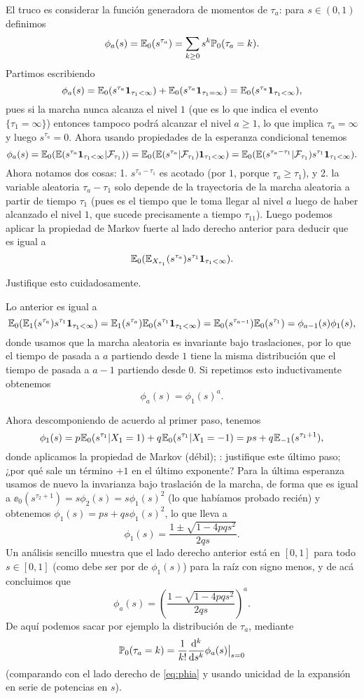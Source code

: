 El truco es considerar la función generadora de momentos de $\tau_a$: para $s\in(0,1)$ definimos
\begin{equation}\label{eq:phia}
\phi_a(s)=\mathbb{E}_0(s^{\tau_a})=\sum_{k\geq0}s^k\mathbb{P}_0(\tau_a=k).
\end{equation}
Partimos escribiendo
\[\phi_a(s)=\mathbb{E}_0(s^{\tau_a}\mathbf{1}_{\tau_1<\infty})+\mathbb{E}_0(s^{\tau_a}\mathbf{1}_{\tau_1=\infty})=\mathbb{E}_0(s^{\tau_a}\mathbf{1}_{\tau_1<\infty}),\]
pues si la marcha nunca alcanza el nivel $1$ (que es lo que indica el evento $\{\tau_1=\infty\}$) entonces tampoco podrá alcanzar el nivel $a\geq1$, lo que implica $\tau_a=\infty$ y luego $s^{\tau_a}=0$.
Ahora usando propiedades de la esperanza condicional tenemos
\[\phi_a(s)=\mathbb{E}_0(\mathbb{E}(s^{\tau_a}\mathbf{1}_{\tau_1<\infty}|\mathcal{F}_{\tau_1}))=\mathbb{E}_0(\mathbb{E}(s^{\tau_a}|\mathcal{F}_{\tau_1})\mathbf{1}_{\tau_1<\infty})=\mathbb{E}_0(\mathbb{E}(s^{\tau_a-\tau_1}|\mathcal{F}_{\tau_1})s^{\tau_1}\mathbf{1}_{\tau_1<\infty}).\]
Ahora notamos dos cosas: 1. $s^{\tau_a-\tau_1}$ es acotado (por $1$, porque $\tau_a\geq\tau_1$), y 2. la variable aleatoria $\tau_a-\tau_1$ solo depende de la trayectoria de la marcha aleatoria a partir de tiempo $\tau_1$ (pues es el tiempo que le toma llegar al nivel $a$ luego de haber alcanzado el nivel $1$, que sucede precisamente a tiempo $\tau_11$).
Luego podemos aplicar la propiedad de Markov fuerte al lado derecho anterior para deducir que es igual a
\[\mathbb{E}_0(\mathbb{E}_{X_{\tau_1}}(s^{\tau_a})s^{\tau_1}\mathbf{1}_{\tau_1<\infty}).\]

\begin{exer}
Justifique esto cuidadosamente.
\end{exer}

Lo anterior es igual a
\[\mathbb{E}_0(\mathbb{E}_{1}(s^{\tau_a})s^{\tau_1}\mathbf{1}_{\tau_1<\infty})=\mathbb{E}_{1}(s^{\tau_a})\mathbb{E}_0(s^{\tau_1}\mathbf{1}_{\tau_1<\infty})=\mathbb{E}_{0}(s^{\tau_{a-1}})\mathbb{E}_0(s^{\tau_1})=\phi_{a-1}(s)\phi_1(s),\]
donde usamos que la marcha aleatoria es invariante bajo traslaciones, por lo que el tiempo de pasada a $a$ partiendo desde $1$ tiene la misma distribución que el tiempo de pasada a $a-1$ partiendo desde $0$.
Si repetimos esto inductivamente obtenemos 
\[\phi_a(s)=\phi_1(s)^a.\]

Ahora descomponiendo de acuerdo al primer paso, tenemos
\[\phi_1(s)=p\hspace{0.05em}\mathbb{E}_0(s^{\tau_1}|X_1=1)+q\hspace{0.05em}\mathbb{E}_0(s^{\tau_1}|X_1=-1)=p\hspace{0.05em} s+q\hspace{0.05em}\mathbb{E}_{-1}(s^{\tau_1+1}),\]
donde aplicamos la propiedad de Markov (débil); \uexers: justifique este último paso; ¿por qué sale un término $+1$ en el último exponente?
Para la última esperanza usamos de nuevo la invarianza bajo traslación de la marcha, de forma que es igual a $\ee_{0}(s^{\tau_2+1})=s\phi_2(s)=s\phi_1(s)^2$ (lo que habíamos probado recién) y obtenemos $\phi_1(s)=ps+qs\phi_1(s)^2$, lo que lleva a 
\[\phi_1(s)=\frac{1\pm\sqrt{1-4pqs^2}}{2qs}.\]
Un análisis sencillo muestra que el lado derecho anterior está en $[0,1]$ para todo $s\in[0,1]$ (como debe ser por de $\phi_1(s)$) para la raíz con signo menos, y de acá concluimos que
\[\phi_a(s)=\left(\frac{1-\sqrt{1-4pqs^2}}{2qs}\right)^a.\]
De aquí podemos sacar por ejemplo la distribución de $\tau_a$, mediante
\[\mathbb{P}_0(\tau_a=k)=\frac{1}{k!}\frac{\mathrm{d}^k}{\mathrm{d} s^k}\phi_a(s)\big|_{s=0}\]
(comparando con el lado derecho de \eqref{eq:phia} y usando unicidad de la expansión en serie de potencias en $s$).

